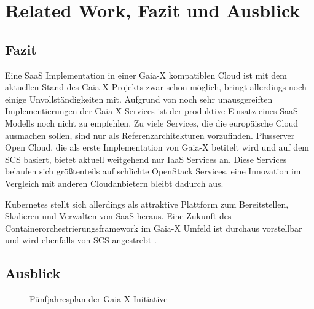 \chapter{Related Work, Fazit und Ausblick}
\label{chapter:fazit}



\section{Fazit}
\label{sec:fazit_ausblick:fazit}

Eine \ac{SaaS} Implementation in einer Gaia-X kompatiblen Cloud ist mit dem aktuellen Stand des Gaia-X Projekts zwar schon 
möglich, bringt allerdings noch einige Unvollständigkeiten mit.
Aufgrund von noch sehr unausgereiften Implementierungen der Gaia-X Services ist der produktive Einsatz eines \ac{SaaS}
Modells noch nicht zu empfehlen. 
Zu viele Services, die die europäische Cloud ausmachen sollen, sind nur als Referenzarchitekturen vorzufinden.
Plusserver Open Cloud, die als erste Implementation von Gaia-X betitelt wird und auf dem \acf{SCS} basiert, 
bietet aktuell weitgehend nur \ac{IaaS} Services an.
Diese Services belaufen sich größtenteils auf schlichte OpenStack Services, 
eine Innovation im Vergleich mit anderen Cloudanbietern bleibt dadurch aus.

Kubernetes stellt sich allerdings als attraktive Plattform zum Bereitstellen, Skalieren und Verwalten von \acf{SaaS} heraus.
Eine Zukunft des Containerorchestrierungsframework im Gaia-X Umfeld ist durchaus vorstellbar und wird ebenfalls von \ac{SCS}
angestrebt \cite{scs}.

\newpage
\section{Ausblick}
\label{sec:fazit_ausblick:ausblick}

\begin{figure}[h]
  \centering
  \caption{Fünfjahresplan der Gaia-X Initiative}
  \label{fig:gaia-x-ausblick}
\end{figure}

